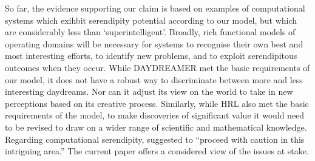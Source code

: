 So far, the evidence supporting our claim is based on examples of
computational systems which exihbit serendipity potential according to our model, but which
are considerably less than `superintelligent'.  Broadly, rich
functional models of operating domains will be necessary for systems
to recognise their own best and most interesting efforts, to identify
new problems, and to exploit serendipitous outcomes when they occur.
While {\sf DAYDREAMER} met the basic requirements of our model, it
does not have a robust way to discriminate between more and less
interesting daydreams.  Nor can it adjust its view on the world to
take in new perceptions based on its creative process.  Similarly,
while {\sf HRL} also met the basic requirements of the model, to make
discoveries of significant value it would need to be revised to draw
on a wider range of scientific and mathematical knowledge.
Regarding computational serendipity, \citet{pease2013discussion}
suggested to ``proceed with caution in this intriguing area.''  The
current paper offers a considered view of the issues at stake.

